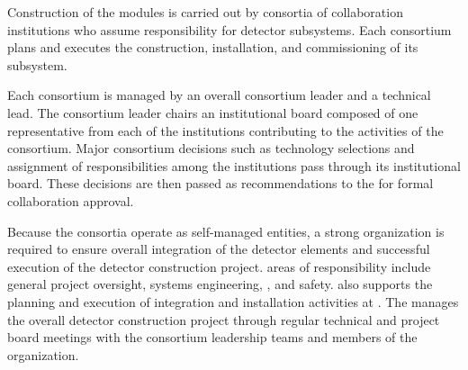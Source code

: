 Construction of the  modules is carried out by 
consortia of collaboration institutions who assume responsibility 
for detector subsystems.  Each consortium plans and executes the 
construction, installation, and commissioning of its subsystem.

Each consortium is managed by an overall consortium leader 
and a technical lead.  The consortium leader chairs an institutional 
board composed of one representative from each of the %
institutions contributing to the activities of the consortium.  Major 
consortium decisions such as technology selections and assignment of 
responsibilities %
among the institutions %
pass  through its institutional board.  These decisions are then passed 
as recommendations to the   for formal collaboration approval.

Because the consortia operate as self-managed entities, a strong
 organization is required to ensure overall integration 
of the detector elements and successful execution of the detector
construction project.   areas of responsibility include 
general project oversight, systems engineering, , and 
safety.   also supports the planning and execution 
of integration and installation activities at .
The  manages the overall detector construction 
project through regular technical and project board meetings with 
the consortium leadership teams and members of the  
organization.

